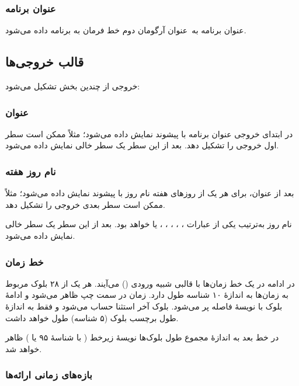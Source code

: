 \documentclass{utap}
\begin{document}
    \subsubsection{عنوان برنامه}

    عنوان برنامه به~عنوان آرگومان دوم خط فرمان به برنامه داده می‌شود.

    \subsection{قالب خروجی‌ها}

    خروجی از چندین بخش تشکیل می‌شود:

    \subsubsection{عنوان}

    در ابتدای خروجی عنوان برنامه با پیشوند \lr{\texttt{\# }} نمایش داده می‌شود؛ مثلاً  ممکن است  سطر اول خروجی را تشکیل دهد. بعد از این سطر یک سطر خالی نمایش داده می‌شود.

    \subsubsection{نام روز هفته}

    بعد از عنوان، برای هر یک از روزهای هفته نام روز با پیشوند \lr{\texttt{\#\# }} نمایش داده می‌شود؛ مثلاً  ممکن است  سطر بعدی خروجی را تشکیل دهد.

    نام روز به‌ترتیب یکی از عبارات ، ، ، ، ،  یا  خواهد بود. بعد از این سطر یک سطر خالی نمایش داده می‌شود.

    \subsubsection{خط زمان}

    در ادامه در یک خط زمان‌ها با قالبی شبیه ورودی () می‌آیند. هر یک از ۲۸ بلوک مربوط به زمان‌ها به اندازهٔ ۱۰ شناسه طول دارد. زمان در سمت چپ ظاهر می‌شود و ادامهٔ  بلوک با نویسهٔ فاصله پر می‌شود. بلوک آخر استثنا حساب می‌شود و فقط به اندازهٔ  طول برچسب بلوک (۵ شناسه) طول خواهد داشت.

    در خط بعد به اندازهٔ مجموع طول بلوک‌ها نویسهٔ زیرخط (\lr{\texttt{\_}} با شناسهٔ  ۹۵ یا ) ظاهر خواهد شد.

    \subsubsection{بازه‌های زمانی ارائه‌ها}
\end{document}
